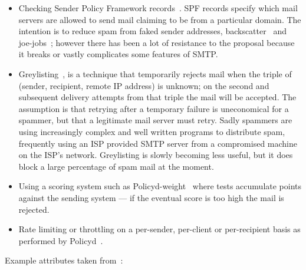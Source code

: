 \documentclass[a4paper,12pt,draft]{article}
\begin{document}
\begin{itemize}

    \item Checking Sender Policy Framework records~\cite{openspf,
        wikipedia-spf}.  SPF records specify which mail servers are allowed
        to send mail claiming to be from a particular domain.  The
        intention is to reduce spam from faked sender addresses,
        backscatter~\cite{postfix-backscatter} and
        joe-jobs~\cite{wikipedia-joe-job}; however there has been a lot of
        resistance to the proposal because it breaks or vastly complicates
        some features of SMTP\@.

    \item Greylisting~\cite{greylisting}, is a technique that temporarily
        rejects mail when the triple of (sender, recipient, remote IP
        address) is unknown; on the second and subsequent delivery attempts
        from that triple the mail will be accepted.  The assumption is that
        retrying after a temporary failure is uneconomical for a spammer,
        but that a legitimate mail server must retry.  Sadly spammers are
        using increasingly complex and well written programs to distribute
        spam, frequently using an ISP provided SMTP server from a
        compromised machine on the ISP's network.  Greylisting is slowly
        becoming less useful, but it does block a large percentage of spam
        mail at the moment.

    \item Using a scoring system such as
        Policyd-weight~\cite{policyd-weight} where tests accumulate points
        against the sending system --- if the eventual score is too high
        the mail is rejected.
        
    \item Rate limiting or throttling on a per-sender, per-client or
        per-recipient basis as performed by Policyd~\cite{policyd}.

\end{itemize}

Example attributes taken from~\cite{policy-servers}:
\end{document}

